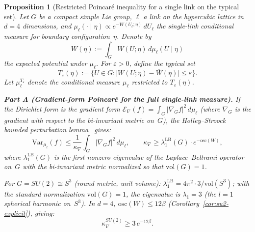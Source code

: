 \documentclass[12pt,a4paper]{article}
\theoremstyle{definition}
\theoremstyle{plain}
\newtheorem{proposition}[definition]{Proposition}
\theoremstyle{remark}
\begin{document}
\begin{proposition}[Restricted Poincar\'e inequality for a single link on the typical set]
\label{prop:restricted-poincare}
Let $G$ be a compact simple Lie group, $\ell$ a link on the hypercubic lattice in $d = 4$ dimensions, and $\mu_\ell(\cdot \mid \eta) \propto e^{-W(U_\ell; \eta)}\,dU_\ell$ the single-link conditional measure for boundary configuration~$\eta$. Denote by
\[
    \overline{W}(\eta) := \int_G W(U;\eta)\,d\mu_\ell(U \mid \eta)
\]
the expected potential under $\mu_\ell$. For $\varepsilon > 0$, define the \emph{typical set}
\begin{equation}\label{eq:typical-set}
    T_\varepsilon(\eta) := \bigl\{U \in G : \bigl|W(U;\eta) - \overline{W}(\eta)\bigr| \leq \varepsilon\bigr\}.
\end{equation}
Let $\mu_\ell^{T_\varepsilon}$ denote the conditional measure $\mu_\ell$ restricted to $T_\varepsilon(\eta)$.

\medskip
\noindent\textbf{Part A (Gradient-form Poincar\'e for the full single-link measure).}
If the Dirichlet form is the gradient form $\mathcal{E}_\nabla(f) = \int_G |\nabla_G f|^2\,d\mu_\ell$ (where $\nabla_G$ is the gradient with respect to the bi-invariant metric on~$G$), the Holley--Stroock bounded perturbation lemma~\cite{HolleyStroock1987} gives:
\begin{equation}\label{eq:gradient-poincare-link}
    \mathrm{Var}_{\mu_\ell}(f) \leq \frac{1}{\kappa_\nabla}\int_G |\nabla_G f|^2\,d\mu_\ell, \qquad \kappa_\nabla \geq \lambda_1^{\mathrm{LB}}(G)\cdot e^{-\mathrm{osc}(W)},
\end{equation}
where $\lambda_1^{\mathrm{LB}}(G)$ is the first nonzero eigenvalue of the Laplace--Beltrami operator on~$G$ with the bi-invariant metric normalized so that $\mathrm{vol}(G) = 1$.

For $G = SU(2) \cong S^3$ (round metric, unit volume): $\lambda_1^{\mathrm{LB}} = 4\pi^2 \cdot 3 / \mathrm{vol}(S^3)$; with the standard normalization $\mathrm{vol}(G)=1$, the eigenvalue is $\lambda_1 = 3$ (the $l=1$ spherical harmonic on~$S^3$). In $d=4$, $\mathrm{osc}(W) \leq 12\beta$ (Corollary~\ref{cor:su2-explicit}), giving:
\begin{equation}\label{eq:gradient-poincare-su2}
    \kappa_\nabla^{SU(2)} \geq 3\,e^{-12\beta}.
\end{equation}


\end{proposition}
\end{document}
